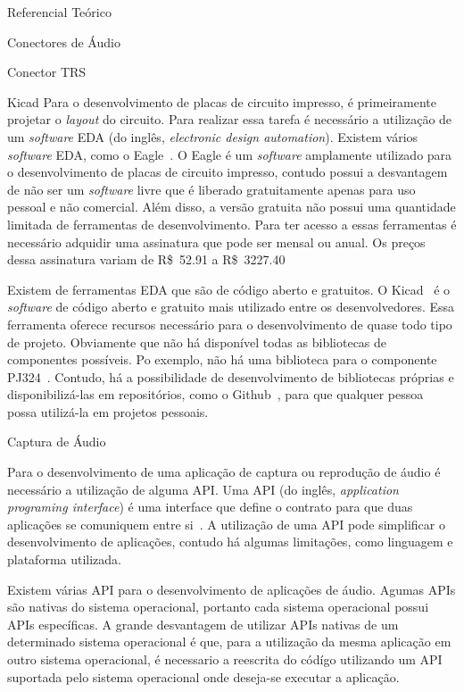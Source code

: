 \begin{chapter}{Referencial Teórico}
\begin{section}{Conectores de Áudio}
\begin{subsection}{Conector TRS}
\end{subsection}

\end{section}


\begin{section}{Kicad}
Para o desenvolvimento de placas de circuito impresso, é primeiramente projetar
o \textit{layout} do circuito. Para realizar essa tarefa é necessário a
utilização de um \textit{software} EDA (do inglês, \textit{electronic design
automation}). Existem vários \textit{software} EDA, como o Eagle~\cite{eagle}. O
Eagle é um \textit{software} amplamente utilizado para o desenvolvimento de
placas de circuito impresso, contudo possui a desvantagem de não ser um
\textit{software} livre que é liberado gratuitamente apenas para uso pessoal e
não comercial. Além disso, a versão gratuita não possui uma quantidade limitada
de ferramentas de desenvolvimento. Para ter acesso a essas ferramentas é
necessário adquidir uma assinatura que pode ser mensal ou anual. Os preços dessa
assinatura variam de R\$~52.91 a R\$~3227.40~\cite{EagleAssinatura}

Existem de ferramentas EDA que são de código aberto e gratuitos. O
Kicad~\cite{kicad} é o  \textit{software} de código aberto e gratuito mais
utilizado entre os desenvolvedores. Essa ferramenta oferece recursos necessário
para o desenvolvimento de quase todo tipo de projeto. Obviamente que não
há disponível todas as bibliotecas de componentes possíveis. Po exemplo, não há
uma biblioteca para o componente PJ324~\cite{pj324}. Contudo, há a possibilidade
de desenvolvimento de bibliotecas próprias e disponibilizá-las em repositórios,
como o Github~\cite{github}, para que qualquer pessoa possa utilizá-la em
projetos pessoais.  
\end{section}



\begin{section}{Captura de Áudio}

Para o desenvolvimento de uma aplicação de captura ou reprodução de áudio é
necessário a utilização de alguma API. Uma API (do inglês, \textit{application
programing interface}) é uma interface que define o contrato para que duas
aplicações se comuniquem entre si~\cite{API17}. A utilização de uma API pode
simplificar o desenvolvimento de aplicações, contudo há algumas limitações, como
linguagem e plataforma utilizada. 

Existem várias API para o desenvolvimento de aplicações de áudio. Agumas APIs são
nativas do sistema operacional, portanto cada sistema operacional possui APIs
específicas. A grande desvantagem de utilizar APIs nativas de um determinado
sistema operacional é que, para a utilização da mesma aplicação em outro sistema
operacional, é necessario a reescrita do códígo utilizando um API suportada pelo
sistema operacional onde deseja-se executar a aplicação. 


\end{section}
\end{chapter}
